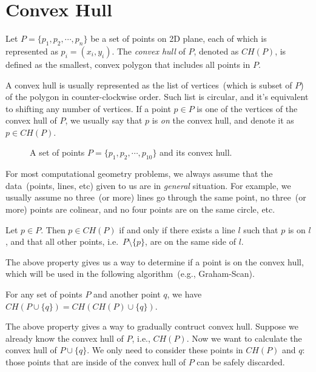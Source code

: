 \setcounter{definition}{0} \setcounter{property}{0} \setcounter{claim}{0} \setcounter{fact}{0} \setcounter{corollary}{0} \setcounter{figure}{0}
\section{Convex Hull}

\begin{definition}
Let $P = \{p_1, p_2, \cdots, p_n\}$ be a set of points on 2D plane, each of which is represented as $p_i = (x_i, y_i)$.
The \emph{convex hull} of $P$, denoted as $CH(P)$, is defined as the smallest, convex polygon that includes all points in $P$.
\end{definition}

A convex hull is usually represented as the list of vertices~(which is subset
of $P$) of the polygon in counter-clockwise order. Such list 
is circular, and it's equivalent to shifting any number of vertices.
If a point $p\in P$ is one of the vertices of the convex hull of $P$,
we usually say that $p$ is \emph{on} the convex hull, and denote it as $p\in CH(P)$.

\begin{figure}[h!]
\centering{}
\caption{A set of points $P = \{p_1, p_2, \cdots, p_{10}\}$ and its convex hull.}
\end{figure}

For most computational geometry problems, we always assume that the data~(points, lines, etc) given
to us are in \emph{general} situation. For example, we usually assume no three~(or more) lines go through the
same point, no three~(or more) points are colinear, and no four points are on the same circle, etc.

\begin{property}
Let $p\in P$. Then $p\in CH(P)$ if and only if there exists a line $l$ such that $p$ is on $l$, and that
all other points, i.e.\ $P\setminus \{p\}$, are on the same side of $l$.
\end{property}

The above property gives us a way to determine if a point is on the convex hull, which will be used
in the following algorithm~(e.g., Graham-Scan). 

\begin{property}
For any set of points $P$ and another point $q$, we have $CH(P \cup \{q\}) = CH(CH(P) \cup \{q\})$.
\end{property}

The above property gives a way to gradually contruct convex hull.
Suppose we already know the convex hull of $P$, i.e., $CH(P)$. Now we want to calculate
the convex hull of $P\cup\{q\}$. We only need to consider these points in $CH(P)$ and $q$:
those points that are inside of the convex hull of $P$ can be safely discarded.

